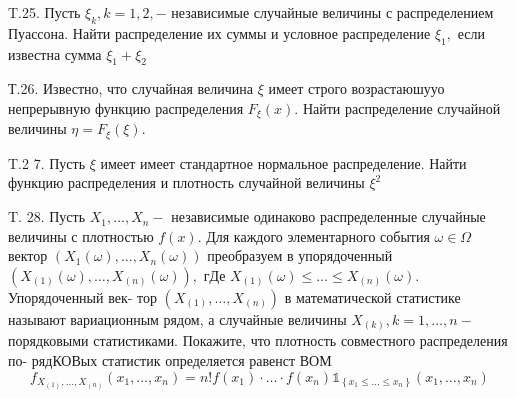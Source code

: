 \documentclass[a4paper,12pt]{article} %
\begin{document}
\begin{example}


T.25. Пусть $\xi_{k}, k=1,2,-$ независимые случайные величины с распределением Пуассона. Найти распределение их суммы и условное распределение $\xi_{1},$ если известна сумма $\xi_{1}+\xi_{2}$



\end{example}





\begin{example}

Т.26. Известно, что случайная величина $\xi$ имеет строго возрастаюшууо непрерывную функцию распределения $F_{\xi}(x) .$ Найти распределение случайной величины $\eta=F_{\xi}(\xi) .$




\end{example}





\begin{example}

T.2 7. Пусть $\xi$ имеет имеет стандартное нормальное распределение. Найти функцию распределения и плотность случайной величины $\xi^{2}$




\end{example}



\begin{example}

T. $28 .$ Пусть $X_{1}, \ldots, X_{n}-$ независимые одинаково распределенные случайные величины с плотностью $f(x) .$ Для каждого элементарного события $\omega \in \Omega$ вектор $\left(X_{1}(\omega), \ldots, X_{n}(\omega)\right)$ преобразуем в упорядоченный $\left(X_{(1)}(\omega), \ldots, X_{(n)}(\omega)\right),$ гДе $X_{(1)}(\omega) \leq \ldots \leq X_{(n)}(\omega) .$ Упорядоченный век-
тор $\left(X_{(1)}, \ldots, X_{(n)}\right)$ в математической статистике называют вариационным рядом, а случайные величины $X_{(k)}, k=1, \ldots, n-$ порядковыми статистиками. Покажите, что плотность совместного распределения по-
рядКОВых статистик определяется равенст ВОМ
$$
f_{X_{(1)}, \ldots, X_{(n)}}\left(x_{1}, \ldots, x_{n}\right)=n ! f\left(x_{1}\right) \cdot \ldots \cdot f\left(x_{n}\right) \mathbb{1}_{\left\{x_{1} \leq \ldots \leq x_{n}\right\}}\left(x_{1}, \ldots, x_{n}\right)
$$




\end{example}
\end{document}
